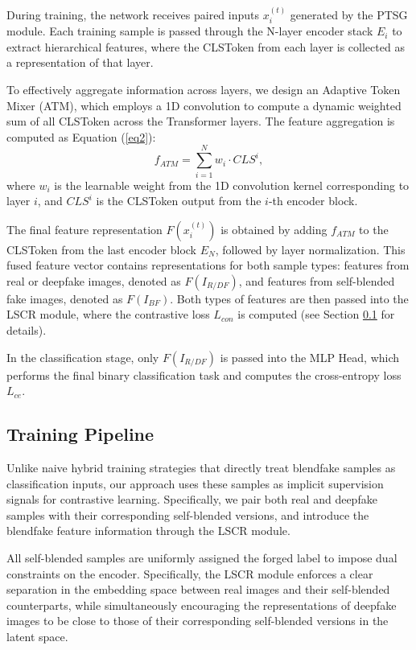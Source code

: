 \documentclass[final,5p,times]{elsarticle}
\begin{document}
During training, the network receives paired inputs $x_i^{(t)}$ generated by the PTSG module. Each training sample is passed through the N-layer encoder stack $E_i$ to extract hierarchical features, where the CLSToken from each layer is collected as a representation of that layer.

To effectively aggregate information across layers, we design an Adaptive Token Mixer (ATM), which employs a 1D convolution to compute a dynamic weighted sum of all CLSToken across the Transformer layers. The feature aggregation is computed as Equation (\ref{eq2}):
\begin{equation} \label{eq2}
f_{ATM}=\sum_{i=1}^N w_i \cdot CLS^i,
\end{equation}
where $w_i$ is the learnable weight from the 1D convolution kernel corresponding to layer $i$, and $CLS^i$ is the CLSToken output from the $i$-th encoder block.

The final feature representation \( F(x_i^{(t)}) \) is obtained by adding \( f_{ATM} \) to the CLSToken from the last encoder block \( E_N \), followed by layer normalization. This fused feature vector contains representations for both sample types: features from real or deepfake images, denoted as \( F(I_{R/DF}) \), and features from self-blended fake images, denoted as \( F(I_{BF}) \). Both types of features are then passed into the LSCR module, where the contrastive loss \( L_{con} \) is computed (see Section \ref{tp} for details).

In the classification stage, only $F(I_{R/DF})$ is passed into the MLP Head, which performs the final binary classification task and computes the cross-entropy loss $L_{ce}$.

\subsection{Training Pipeline} \label{tp}

Unlike naive hybrid training strategies that directly treat blendfake samples as classification inputs, our approach uses these samples as implicit supervision signals for contrastive learning. Specifically, we pair both real and deepfake samples with their corresponding self-blended versions, and introduce the blendfake feature information through the LSCR module.

All self-blended samples are uniformly assigned the forged label to impose dual constraints on the encoder. Specifically, the LSCR module enforces a clear separation in the embedding space between real images and their self-blended counterparts, while simultaneously encouraging the representations of deepfake images to be close to those of their corresponding self-blended versions in the latent space.
\end{document}
